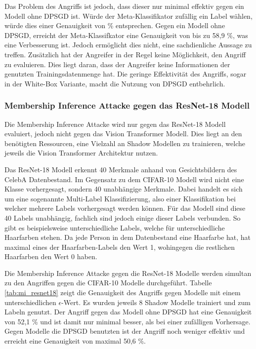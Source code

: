 Das Problem des Angriffs ist jedoch, dass dieser nur minimal effektiv gegen ein Modell ohne DPSGD ist. 
Würde der Meta-Klassifikator zufällig ein Label wählen, würde dies einer Genauigkeit von  \% entsprechen. 
Gegen ein Modell ohne DPSGD, erreicht der Meta-Klassifkator eine Genauigkeit von bis zu 58,9 \%, was eine Verbesserung ist.
Jedoch ermöglicht dies nicht, eine sachdienliche Aussage zu treffen.
Zusätzlich hat der Angreifer in der Regel keine Möglichkeit, den Angriff zu evaluieren. 
Dies liegt daran, dass der Angreifer keine Informationen \bzgl der genutzten Trainingsdatenmenge hat.
Die geringe Effektivität des Angriffs, sogar in der White-Box Variante, macht die Nutzung von DPSGD entbehrlich.

\subsubsection*{Membership Inference Attacke gegen das ResNet-18 Modell}
Die Membership Inference Attacke wird nur gegen das ResNet-18 Modell evaluiert, jedoch nicht gegen das Vision Transformer Modell.
Dies liegt an den benötigten Ressourcen, eine Vielzahl an Shadow Modellen zu trainieren, welche jeweils die Vision Transformer Architektur nutzen.

Das ResNet-18 Modell erkennt 40 Merkmale anhand von Gesichtsbildern des CelebA Datenbestand.
Im Gegensatz zu dem CIFAR-10 Modell wird nicht eine Klasse vorhergesagt, sondern 40 unabhängige Merkmale.
Dabei handelt es sich um eine sogenannte Multi-Label Klassifizierung, also einer Klassifikation bei welcher mehrere Labels vorhergesagt werden können.
Für das Modell sind diese 40 Labels unabhängig, fachlich sind jedoch einige dieser Labels verbunden.
So gibt es beispielsweise unterschiedliche Labels, welche für unterschiedliche Haarfarben stehen.
Da jede Person in dem Datenbestand eine Haarfarbe hat, hat maximal eines der Haarfarben-Labels den Wert 1, wohingegen die restlichen Haarfarben den Wert 0 haben.

Die Membership Inference Attacke gegen die ResNet-18 Modelle werden simultan zu den Angriffen gegen die CIFAR-10 Modelle durchgeführt.
Tabelle \ref{tab:mi_resnet18} zeigt die Genauigkeit des Angriffs gegen Modelle mit einem unterschiedlichen $\epsilon$-Wert.
Es wurden jeweils 8 Shadow Modelle trainiert und zum Labeln genutzt.
Der Angriff gegen das Modell ohne DPSGD hat eine Genauigkeit von 52,1 \% und ist damit nur minimal besser, als bei einer zufälligen Vorhersage.
Gegen Modelle die DPSGD benutzten ist der Angriff noch weniger effektiv und erreicht eine Genauigkeit von maximal 50,6 \%.


